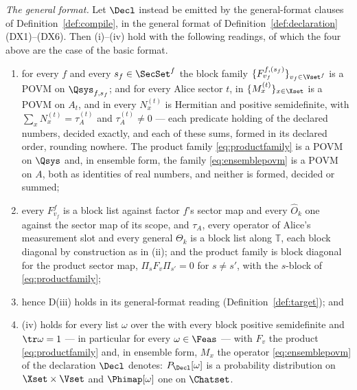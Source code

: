 \begin{theorem}
\emph{The general format.} Let $\Decl$ instead be emitted by the
general-format clauses of Definition~\ref{def:compile}, in the general format
of Definition~\ref{def:declaration}\,(DX1)--(DX6). Then (i)--(iv) hold with
the following readings, of which the four above are the case of the basic
format.
\begin{enumerate}[label=(\roman*$'$),leftmargin=2.6em]
\item for every  $f$ and every $s_f\in\SecSet^{f}$ the
block family $\{F^{f,(s_f)}_{v_f}\}_{v_f\in\Vset^{f}}$ is a POVM on
$\Qsys_{f,s_f}$; and for every Alice sector $t$, in 
$\{M^{(t)}_x\}_{x\in\Xset}$ is a POVM on $A_t$, and in 
every $N^{(t)}_x$ is Hermitian and positive semidefinite, with
$\sum_xN^{(t)}_x=\tau^{(t)}_A$ and $\tau^{(t)}_A\ne0$ --- each predicate
holding of the declared numbers, decided exactly, and each of these sums,
formed in its declared order, rounding nowhere. The product family
\eqref{eq:productfamily} is a POVM on $\Qsys$ and, in ensemble form, the
family \eqref{eq:ensemblepovm} is a POVM on $A$, both as identities of real
numbers, and neither is formed, decided or summed;
\item every $F^{f}_{v_f}$ is a block list against factor $f$'s sector map and
every $\hat O_k$ one against the sector map of its scope, and $\tau_A$, every
operator of Alice's measurement slot and every general $\Theta_k$ is a block
list along $\mathbb{T}$, each block diagonal by construction as in (ii); and
the product family is block diagonal for the product sector map,
$\Pi_sF_v\Pi_{s'}=0$ for $s\ne s'$, with the $s$-block of
\eqref{eq:productfamily};
\item hence D(iii) holds in its general-format reading
(Definition~\ref{def:target}); and
\item (iv) holds for every list $\omega$ over the
 with every block positive semidefinite and
$\tr\omega=1$ --- in particular for every $\omega\in\Feas$ --- with $F_v$ the
product \eqref{eq:productfamily} and, in ensemble form, $M_x$ the operator
\eqref{eq:ensemblepovm} of the declaration $\Decl$ denotes: $P_{\Decl}[\omega]$
is a probability distribution on $\Xset\times\Vset$ and $\Phimap[\omega]$ one
on $\Chatset$.
\end{enumerate}
\end{theorem}

